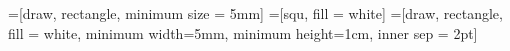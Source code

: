 =[draw, rectangle, minimum size = 5mm]
=[squ, fill = white]
=[draw, rectangle, fill = white, minimum width=5mm, minimum height=1cm, inner sep = 2pt]

% 
% 
\usepackage[absolute,overlay]{textpos}


\usepackage{../../style/lmu-lecture-new}

\let\code=\texttt


\makeatletter
\def\maxwidth{ %
  \ifdim\Gin@nat@width>\linewidth
    \linewidth
  \else
    \Gin@nat@width
  \fi
}
\makeatother


\newenvironment{knitrout}{}{}

\newcommand{\citebutton}[2]{%
\beamergotobutton{\href{#2}{#1}}%
}

\newcommand{\ques}{\textbf{\textcolor{red}{Question:  }}}
\newcommand{\questionssofar}{\begin{frame}\frametitle{Any questions?}\end{frame}}

